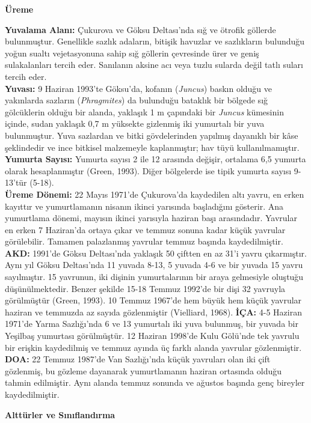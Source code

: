 \documentclass[
  a4paper,
  DIV=11,
  numbers=noendperiod]{scrartcl}
\begin{document}
\textbf{Üreme}

\textbf{Yuvalama Alanı:} Çukurova ve Göksu Deltası'nda sığ ve ötrofik
göllerde bulunmuştur. Genellikle sazlık adaların, bitişik havuzlar ve
sazlıkların bulunduğu yoğun sualtı vejetasyonuna sahip sığ göllerin
çevresinde ürer ve geniş sulakalanları tercih eder. Sanılanın aksine acı
veya tuzlu sularda değil tatlı suları tercih eder.\\
\textbf{Yuvası:} 9 Haziran 1993'te Göksu'da, kofanın (\emph{Juncus})
baskın olduğu ve yakınlarda sazların (\emph{Phragmites}) da bulunduğu
bataklık bir bölgede sığ gölcüklerin olduğu bir alanda, yaklaşık 1 m
çapındaki bir \emph{Juncus} kümesinin içinde, sudan yaklaşık 0,7 m
yüksekte gizlenmiş iki yumurtalı bir yuva bulunmuştur. Yuva sazlardan ve
bitki gövdelerinden yapılmış dayanıklı bir kâse şeklindedir ve ince
bitkisel malzemeyle kaplanmıştır; hav tüyü kullanılmamıştır.\\
\textbf{Yumurta Sayısı:} Yumurta sayısı 2 ile 12 arasında değişir,
ortalama 6,5 yumurta olarak hesaplanmıştır (Green, 1993). Diğer
bölgelerde ise tipik yumurta sayısı 9-13'tür (5-18).\\
\textbf{Üreme Dönemi:} 22 Mayıs 1971'de Çukurova'da kaydedilen altı
yavru, en erken kayıttır ve yumurtlamanın nisanın ikinci yarısında
başladığını gösterir. Ana yumurtlama dönemi, mayısın ikinci yarısıyla
haziran başı arasındadır. Yavrular en erken 7 Haziran'da ortaya çıkar ve
temmuz sonuna kadar küçük yavrular görülebilir. Tamamen palazlanmış
yavrular temmuz başında kaydedilmiştir. \textbf{AKD:} 1991'de Göksu
Deltası'nda yaklaşık 50 çiftten en az 31'i yavru çıkarmıştır. Aynı yıl
Göksu Deltası'nda 11 yuvada 8-13, 5 yuvada 4-6 ve bir yuvada 15 yavru
sayılmıştır. 15 yavrunun, iki dişinin yumurtalarının bir araya
gelmesiyle oluştuğu düşünülmektedir. Benzer şekilde 15-18 Temmuz 1992'de
bir dişi 32 yavruyla görülmüştür (Green, 1993). 10 Temmuz 1967'de hem
büyük hem küçük yavrular haziran ve temmuzda az sayıda gözlenmiştir
(Vielliard, 1968). \textbf{İÇA:} 4-5 Haziran 1971'de Yarma Sazlığı'nda 6
ve 13 yumurtalı iki yuva bulunmuş, bir yuvada bir Yeşilbaş yumurtası
görülmüştür. 12 Haziran 1998'de Kulu Gölü'nde tek yavrulu bir erişkin
kaydedilmiş ve temmuz ayında üç farklı alanda yavrular gözlenmiştir.
\textbf{DOA:} 22 Temmuz 1987'de Van Sazlığı'nda küçük yavruları olan iki
çift gözlenmiş, bu gözleme dayanarak yumurtlamanın haziran ortasında
olduğu tahmin edilmiştir. Aynı alanda temmuz sonunda ve ağustos başında
genç bireyler kaydedilmiştir.

\textbf{Alttürler ve Sınıflandırma}
\end{document}
